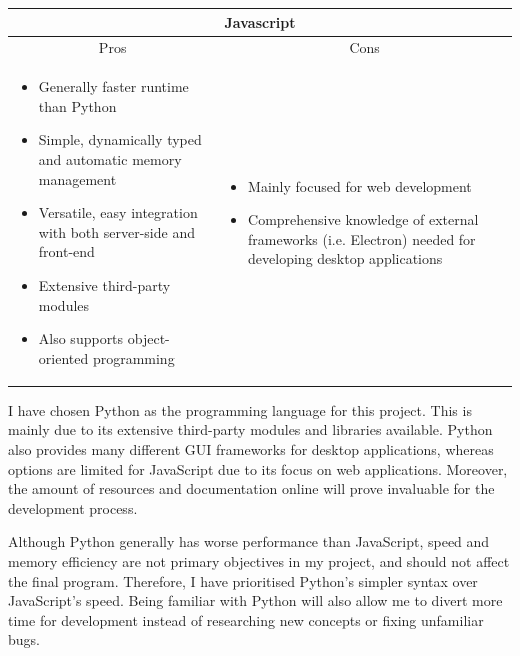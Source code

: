 \documentclass[../main/main.tex]{subfiles}
\begin{document}
\begin{longtable}{ll}
    \toprule
    \multicolumn{2}{c}{Javascript}\\
    \midrule
    \multicolumn{1}{c}{Pros} & \multicolumn{1}{c}{Cons}\\
    \midrule

    \parbox[t][][t]{0.5\textwidth}{
        \begin{itemize}
            \item Generally faster runtime than Python
            \item Simple, dynamically typed and automatic memory management
            \item Versatile, easy integration with both server-side and front-end
            \item Extensive third-party modules
            \item Also supports object-oriented programming
        \end{itemize}
    } & \parbox[t][][t]{0.5\textwidth}{
        \begin{itemize}
            \item Mainly focused for web development
            \item Comprehensive knowledge of external frameworks (i.e. Electron) needed for developing desktop applications
        \end{itemize}
    }
    \\
    \bottomrule
\end{longtable}

I have chosen Python as the programming language for this project. This is mainly due to its extensive third-party modules and libraries available. Python also provides many different GUI frameworks for desktop applications, whereas options are limited for JavaScript due to its focus on web applications. Moreover, the amount of resources and documentation online will prove invaluable for the development process.

Although Python generally has worse performance than JavaScript, speed and memory efficiency are not primary objectives in my project, and should not affect the final program. Therefore, I have prioritised Python’s simpler syntax over JavaScript’s speed. Being familiar with Python will also allow me to divert more time for development instead of researching new concepts or fixing unfamiliar bugs.
\end{document}
